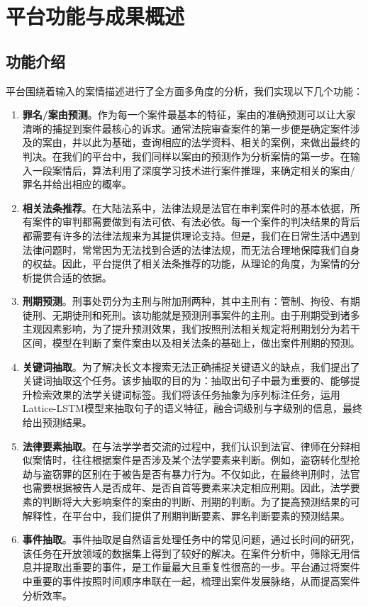 \chapter{平台功能与成果概述}

\section{功能介绍}
平台围绕着输入的案情描述进行了全方面多角度的分析，我们实现以下几个功能：
\begin{enumerate}[1)]
	\item \textbf{罪名/案由预测}。作为每一个案件最基本的特征，案由的准确预测可以让大家清晰的捕捉到案件最核心的诉求。通常法院审查案件的第一步便是确定案件涉及的案由，并以此为基础，查询相应的法学资料、相关的案例，来做出最终的判决。在我们的平台中，我们同样以案由的预测作为分析案情的第一步。在输入一段案情后，算法利用了深度学习技术进行案件推理，来确定相关的案由/罪名并给出相应的概率。
	\item \textbf{相关法条推荐}。在大陆法系中，法律法规是法官在审判案件时的基本依据，所有案件的审判都需要做到有法可依、有法必依。每一个案件的判决结果的背后都需要有许多的法律法规来为其提供理论支持。但是，我们在日常生活中遇到法律问题时，常常因为无法找到合适的法律法规，而无法合理地保障我们自身的权益。因此，平台提供了相关法条推荐的功能，从理论的角度，为案情的分析提供合适的依据。
	\item \textbf{刑期预测}。刑事处罚分为主刑与附加刑两种，其中主刑有：管制、拘役、有期徒刑、无期徒刑和死刑。该功能就是预测刑事案件的主刑。由于刑期受到诸多主观因素影响，为了提升预测效果，我们按照刑法相关规定将刑期划分为若干区间，模型在判断了案件案由以及相关法条的基础上，做出案件刑期的预测。
	\item \textbf{关键词抽取}。为了解决长文本搜索无法正确捕捉关键语义的缺点，我们提出了关键词抽取这个任务。该步抽取的目的为：抽取出句子中最为重要的、能够提升检索效果的法学关键词标签。我们将该任务抽象为序列标注任务，运用Lattice-LSTM模型来抽取句子的语义特征，融合词级别与字级别的信息，最终给出预测结果。
	\item \textbf{法律要素抽取}。在与法学学者交流的过程中，我们认识到法官、律师在分辩相似案情时，往往根据案件是否涉及某个法学要素来判断。例如，盗窃转化型抢劫与盗窃罪的区别在于被告是否有暴力行为。不仅如此，在最终判刑时，法官也需要根据被告人是否成年、是否自首等要素来决定相应刑期。因此，法学要素的判断将大大影响案件的案由的判断、刑期的判断。为了提高预测结果的可解释性，在平台中，我们提供了刑期判断要素、罪名判断要素的预测结果。
	\item \textbf{事件抽取}。事件抽取是自然语言处理任务中的常见问题，通过长时间的研究，该任务在开放领域的数据集上得到了较好的解决。在案件分析中，筛除无用信息并提取出重要的事件，是工作量最大且重复性很高的一步。平台通过将案件中重要的事件按照时间顺序串联在一起，梳理出案件发展脉络，从而提高案件分析效率。

\end{enumerate}
